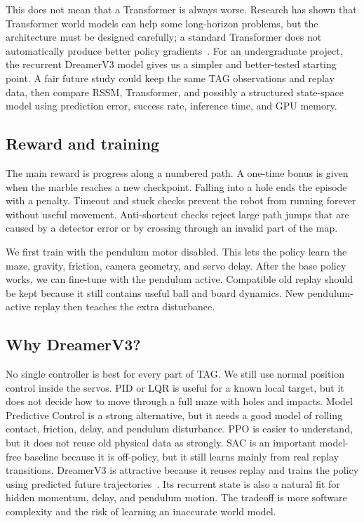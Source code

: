 \documentclass[9pt]{extarticle}
\begin{document}
This does not mean that a Transformer is always worse. Research has shown that Transformer world models can help some long-horizon problems, but the architecture must be designed carefully; a standard Transformer does not automatically produce better policy gradients~\cite{ma2024transformer}. For an undergraduate project, the recurrent DreamerV3 model gives us a simpler and better-tested starting point. A fair future study could keep the same TAG observations and replay data, then compare RSSM, Transformer, and possibly a structured state-space model using prediction error, success rate, inference time, and GPU memory.

\subsection{Reward and training}
The main reward is progress along a numbered path. A one-time bonus is given when the marble reaches a new checkpoint. Falling into a hole ends the episode with a penalty. Timeout and stuck checks prevent the robot from running forever without useful movement. Anti-shortcut checks reject large path jumps that are caused by a detector error or by crossing through an invalid part of the map.

We first train with the pendulum motor disabled. This lets the policy learn the maze, gravity, friction, camera geometry, and servo delay. After the base policy works, we can fine-tune with the pendulum active. Compatible old replay should be kept because it still contains useful ball and board dynamics. New pendulum-active replay then teaches the extra disturbance.

\subsection{Why DreamerV3?}
No single controller is best for every part of TAG. We still use normal position control inside the servos. PID or LQR is useful for a known local target, but it does not decide how to move through a full maze with holes and impacts. Model Predictive Control is a strong alternative, but it needs a good model of rolling contact, friction, delay, and pendulum disturbance. PPO is easier to understand, but it does not reuse old physical data as strongly. SAC is an important model-free baseline because it is off-policy, but it still learns mainly from real replay transitions. DreamerV3 is attractive because it reuses replay and trains the policy using predicted future trajectories~\cite{hafner2025dreamerv3}. Its recurrent state is also a natural fit for hidden momentum, delay, and pendulum motion. The tradeoff is more software complexity and the risk of learning an inaccurate world model.
\end{document}
